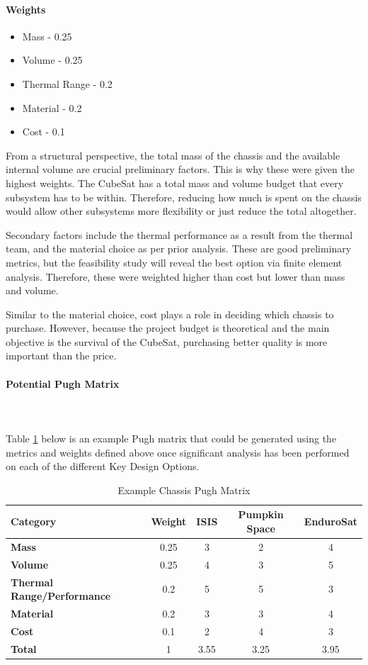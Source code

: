 \paragraph{Weights}
\begin{itemize}
    \item Mass - 0.25
    \item Volume - 0.25
    \item Thermal Range - 0.2
    \item Material - 0.2
    \item Cost - 0.1
\end{itemize}

From a structural perspective, the total mass of the chassis and the available internal volume are crucial preliminary factors. This is why these were given the highest weights. The CubeSat has a total mass and volume budget that every subsystem has to be within. Therefore, reducing how much is spent on the chassis would allow other subsystems more flexibility or just reduce the total altogether. 

Secondary factors include the thermal performance as a result from the thermal team, and the material choice as per prior analysis. These are good preliminary metrics, but the feasibility study will reveal the best option via finite element analysis. Therefore, these were weighted higher than cost but lower than mass and volume.

Similar to the material choice, cost plays a role in deciding which chassis to purchase. However, because the project budget is theoretical and the main objective is the survival of the CubeSat, purchasing better quality is more important than the price. 

\paragraph{Potential Pugh Matrix} ~\\~\\

Table \ref{tbl:chassis_Pugh} below is an example Pugh matrix that could be generated using the metrics and weights defined above once significant analysis has been performed on each of the different Key Design Options. 
\begin{table}[H]
\centering
\begin{tabular}{|l|c|c|c|c|} 
\hline
    \textbf{Category} & \textbf{Weight} & \textbf{ISIS} & \textbf{Pumpkin Space} & \textbf{EnduroSat}
    \\
\hline
    \textbf{Mass} & 0.25 & 3 & 2 & 4
    \\
\hline
    \textbf{Volume} & 0.25 & 4 & 3 & 5
    \\
\hline
    \textbf{Thermal Range/Performance} & 0.2 & 5 & 5 & 3
    \\
\hline
    \textbf{Material} & 0.2 & 3 & 3 & 4
    \\
\hline
    \textbf{Cost} & 0.1 & 2 & 4 & 3
    \\
\hline
    \textbf{Total} & 1 & 3.55 & 3.25 & 3.95
    \\
\hline
\end{tabular}
\caption{Example Chassis Pugh Matrix }
\label{tbl:chassis_Pugh}
\end{table}

